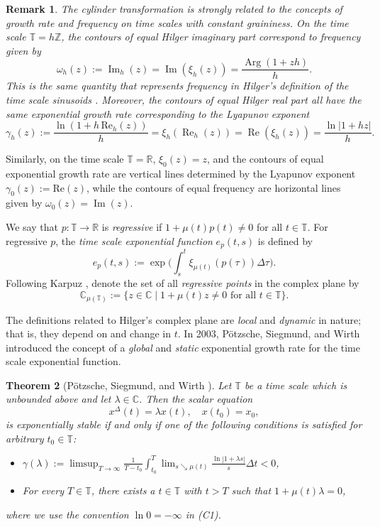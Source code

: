 \documentclass[10pt,a4paper]{amsart}
\DeclareMathOperator{\myRe}{Re}
\DeclareMathOperator{\myIm}{Im}
\numberwithin{equation}{section}
\newtheorem{theorem}{Theorem}[section]
\newtheorem{remark}[theorem]{Remark}
\begin{document}
\begin{remark} \rm
The cylinder transformation is strongly related to the concepts of growth rate and
frequency on time scales with constant graininess. On the time scale
$\mathbb{T}=h\mathbb{Z}$, the contours of equal Hilger imaginary part correspond
to frequency given by
\begin{equation}
\label{eq:usefulIm}
\omega_h(z):=\operatorname{Im}_h(z) = \myIm(\xi_h(z)) = \frac{\operatorname{Arg}(1+z h)}{h}.
\end{equation}
This is the same quantity that represents frequency in Hilger's definition of the
time scale sinusoids \cite{HiA}. Moreover, the contours of equal Hilger real part
all have the same exponential growth rate corresponding to the Lyapunov exponent
\begin{equation}
\label{eq:usefulRe}
\gamma_{h}(z):= \frac{\ln(1+h\, \text{Re}_h(z))}{h}
= \xi_{h}(\myRe_h(z)) = \myRe(\xi_h(z)) = \frac{\ln|1+hz|}{h}.
\end{equation}
\end{remark}
Similarly, on the time scale $\mathbb{T}=\mathbb{R}$, $\xi_0(z) = z$, and the contours
of equal exponential growth rate are vertical lines determined by the Lyapunov
exponent $\gamma_0(z):=\text{Re}(z)$, while the contours of equal frequency are
horizontal lines given by $\omega_0(z)=\operatorname{Im}(z)$.

We say that $p:\mathbb{T} \to \mathbb{R}$ is \emph{regressive} if $1+\mu(t)p(t)\not=0$
for all $t\in\mathbb{T}$.
For regressive $p$, the \emph{time scale exponential function} $e_p(t,s)$ is defined by
 \[
 e_{p}(t,s) := \exp\Big(\int_{s}^{t} \xi_{\mu(t)}(p(\tau)) \Delta \tau \Big).
 \]
Following Karpuz \cite{Ka}, denote the set of all \emph{regressive points} in the
complex plane by
$$
\mathbb{C}_{\mu(\mathbb{T})}:=\{z \in \mathbb{C} \mid 1+\mu(t) z \neq 0 \text{ for all } t \in \mathbb{T}\}.
$$

The definitions related to Hilger's complex plane are \emph{local} and \emph{dynamic}
in nature; that is, they depend on and change in $t$. In 2003, P\"{o}tzsche, Siegmund,
 and Wirth introduced the concept of a \emph{global} and \emph{static} exponential
 growth rate for the time scale exponential function.

\begin{theorem}[P\"{o}tzsche, Siegmund, and Wirth \cite{PoSiWi}]\label{PSW1}
Let $\mathbb{T}$ be a time scale which is unbounded above and let $\lambda
\in \mathbb{C}$. Then the scalar equation
 $$
 x^{\Delta}(t)=\lambda x(t), \quad x(t_0)=x_0,
 $$
is exponentially stable if and
only if one of the following conditions is satisfied for arbitrary
$t_0 \in \mathbb{T}$:
\begin{itemize}
\item[(C1)] $\gamma(\lambda):=  \limsup_{T \to
\infty}\frac{1}{T-t_0}\int_{t_0}^{T}\lim_{s \searrow
\mu(t)} \frac{\ln|1+\lambda s|}{s}\Delta t <0$,

\item[(C2)] For every
$T \in \mathbb{T}$, there exists a $t \in \mathbb{T}$ with $t>T$ such that
$1+\mu(t)\lambda=0$,
\end{itemize}
where we use the convention $\ln 0=-\infty$ in \textup{(C1)}.
\end{theorem}
\end{document}
